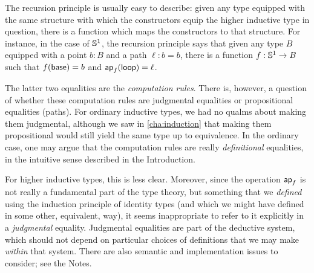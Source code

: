 %
%
The recursion principle is usually easy to describe: given any type equipped with the same structure with which the constructors equip the higher inductive type in question, there is a function which maps the constructors to that structure.
For instance, in the case of $\mathbb{S}^1$, the recursion principle says that given any type $B$ equipped with a point $b:B$ and a path $\ell:b=b$, there is a function $f:\mathbb{S}^1\to B$ such that $f(\mathsf{base})=b$ and $\mathsf{ap}_{f} (\mathsf{loop}) = \ell$.

%
%
The latter two equalities are the \emph{computation rules}.
There is, however, a question of whether these computation rules are judgmental equalities or propositional equalities (paths).
For ordinary inductive types, we had no qualms about making them judgmental, although we saw in \autoref{cha:induction} that making them propositional would still yield the same type up to equivalence.
In the ordinary case, one may argue that the computation rules are really \emph{definitional} equalities, in the intuitive sense described in the Introduction.

%
For higher inductive types, this is less clear. %
Moreover, since the operation $\mathsf{ap}_{f}$ is not really a fundamental part of the type theory, but something that we \emph{defined} using the induction principle of identity types (and which we might have defined in some other, equivalent, way), it seems inappropriate to refer to it explicitly in a \emph{judgmental} equality.
Judgmental equalities are part of the deductive system, which should not depend on particular choices of definitions that we may make \emph{within} that system.
There are also semantic and implementation issues to consider; see the Notes.

